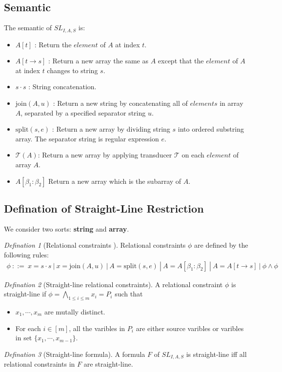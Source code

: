 \documentclass[12pt]{article}
\theoremstyle{remark}
\newtheorem{definition}{Defination}[section]
\begin{document}
\subsection{Semantic}
The semantic of $SL_{I,A,S} $ is:
\begin{itemize}
    \item $A[t]$ : Return the $element$ of $A$ at index $t$.
    \item $A[t\rightarrow s]$ : Return a new array the same as $A$ except  that the $element$ of $A$ at index $t$ changes to string $s$.
    \item $s\cdot s$ : String concatenation.
    \item $\mathrm{join}(A,u) $ : Return a new string by concatenating all of $elements$ in array $A$, separated by a specified separator string $u$.
    \item $\mathrm{split}(s,e) $ : Return a new array by dividing string $s$ into ordered substring array. The separator string is regular expression $e$.
    \item $\mathcal{T}(A) $: Return a new array by applying transducer $\mathcal{T}$ on each $element$ of array $A$. 
    \item $A[\beta_1:\beta_2] $ Return a new array which is the subarray of $A$.
\end{itemize}
\subsection{Defination of Straight-Line Restriction }
We consider two sorts: \textbf{string} and \textbf{array}.
\begin{definition}[Relational constraints ]
    Relational constraints $\phi$ are defined by the following rules:
    \begin{align*}
        \phi \ ::= \ x=s\cdot s \ |\ x=\mathrm{join}(A,u) \ |\ A = \mathrm{split}(s,e) \ |\ A = A[\beta_1:\beta_2] \ |\ A = A[t\rightarrow s] \ |\ \phi \wedge \phi
    \end{align*}
\end{definition}
\begin{definition}[Straight-line relational constraints] 
    A relational constraint $\phi$ is straight-line if $\phi = \bigwedge\limits_{1\leq i \leq m} x_i = P_i$ such that
    \begin{itemize}
        \item $x_1,\cdots,x_m $ are mutally distinct.
        \item For each $i\in [m] $, all the varibles in $P_i$ are either source varibles or varibles in set $\{x_1,\cdots,x_{m-1} \}$.
    \end{itemize} 
\end{definition}
\begin{definition}[Straight-line formula]
    A formula $F$ of $SL_{I,A,S}$ is straight-line iff all relational constraints in $F$ are straight-line.
\end{definition}
\end{document}
